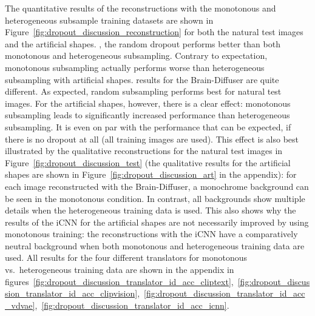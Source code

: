 
The quantitative results of the reconstructions with the monotonous and heterogeneous subsample training datasets are shown in Figure~\ref{fig:dropout_discussion_reconstruction} for both the natural test images and the artificial shapes. , the random dropout performs better than both monotonous and heterogeneous subsampling. Contrary to expectation, monotonous subsampling actually performs worse than heterogeneous subsampling with artificial shapes.  results for the Brain-Diffuser are quite different. As expected, random subsampling performs best for natural test images. For the artificial shapes, however, there is a clear effect: monotonous subsampling leads to significantly increased performance than heterogeneous subsampling. It is even on par with the performance that can be expected, if there is no dropout at all (all training images are used). This effect is also best illustrated by the qualitative reconstructions for the natural test images in Figure~\ref{fig:dropout_discussion_test} (the qualitative results for the artificial shapes are shown in Figure~\ref{fig:dropout_discussion_art} in the appendix): for each image reconstructed with the Brain-Diffuser, a monochrome background can be seen in the monotonous condition. In contrast, all backgrounds show multiple details when the heterogeneous training data is used. This also shows why the results of the iCNN for the artificial shapes are not necessarily improved by using monotonous training: the reconstructions with the iCNN have a comparatively neutral background when both monotonous and heterogeneous training data are used. All results for the four different translators for monotonous vs.\ heterogeneous training data are shown in the appendix in figures~\ref{fig:dropout_discussion_translator_id_acc_cliptext},~\ref{fig:dropout_discussion_translator_id_acc_clipvision},~\ref{fig:dropout_discussion_translator_id_acc_vdvae},~\ref{fig:dropout_discussion_translator_id_acc_icnn}. 

